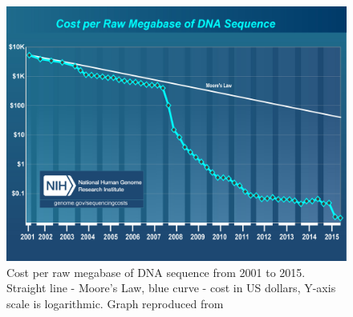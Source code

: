 \chapter[Appendix]{}
\begin{figure}[hb!]
\begin{center}
\includegraphics[scale=0.5]{costperMb2015_4.jpg}
\end{center}
\caption[Cost per raw megabase of DNA sequence from 2001 to 2015]{Cost per raw megabase of DNA sequence from 2001 to 2015. Straight line - Moore's Law, blue curve - cost in US dollars, Y-axis scale is logarithmic. Graph reproduced from \citep{wetterstrand2016}}
\end{figure}

